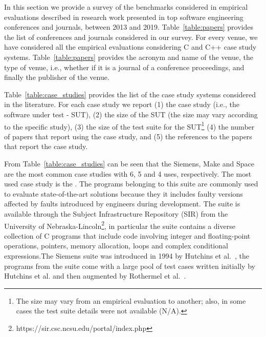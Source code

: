 


In this section we provide a survey of the benchmarks considered in empirical evaluations described in research work presented in top software engineering conferences and journals, between 2013 and 2019. Table~\ref{table:papers} provides the list of conferences and journals considered in our survey. For every venue, we have considered all the empirical evaluations considering C and C++ case study systems. Table~\ref{table:papers} provides the acronym and name of the venue, the type of venue, i.e., whether if it is a journal of a conference proceedings, and finally the publisher of the venue. 





Table~\ref{table:case_studies} provides the list of the case study systems considered in the literature. For each case study we report (1) the case study (i.e., the software under test - SUT), (2) the size of the SUT (the size may vary according to the specific study), (3) the size of the test suite for the SUT\footnote{The size may vary from an empirical evaluation to another; also, in some cases the test suite details were not available (N/A).} (4) the number of papers that report using the case study, and (5) the references to the papers that report the case study.


From Table~\ref{table:case_studies} can be seen that the Siemens, Make and Space are the most common case studies with 6, 5 and 4 uses, respectively. 
The most used case study is the . The programs belonging to this suite are commonly used to evaluate state-of-the-art solutions because they it includes faulty versions affected by faults introduced by engineers during development. The suite is available through the Subject Infrastructure Repository (SIR) from the University of Nebraska-Lincoln\footnote{https://sir.csc.ncsu.edu/portal/index.php}, in particular the suite contains a diverse collection of C programs that include code involving integer and floating-point operations, pointers, memory allocation, loops and complex conditional expressions.The Siemens suite was introduced in 1994 by Hutchins et al.~\cite{hutchins1994experiments}, the programs from the suite come with a large pool of test cases written initially by Hutchins et al. and then augmented by Rothermel et al.~\cite{rothermel1998empirical}.

